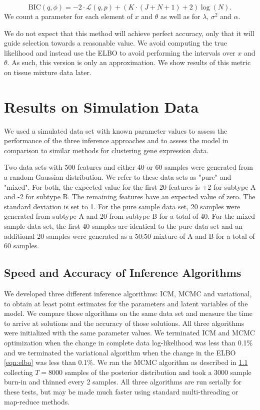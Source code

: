 \documentclass[11pt]{amsart}
\begin{document}
\begin{equation}
\text{BIC}(q,\phi) = -2 \cdot \mathcal{L}(q, p) + \left( K \cdot (J + N + 1) +2 \right) \log(N).
\end{equation} 
We count a parameter for each element of $x$ and $\theta$ as well as for $\lambda$, $\sigma^2$ and $\alpha$.

We do not expect that this method will achieve perfect accuracy, only that it will guide selection towards a reasonable value. We avoid computing the true likelihood and instead use the ELBO to avoid performing the intervals over $x$ and $\theta$. As such, this version is only an approximation. We show results of this metric on tissue mixture data later.

\section{Results on Simulation Data}

We used a simulated data set with known parameter values to assess the performance of the three inference approaches and to assess the model in comparison to similar methods for clustering gene expression data.

Two data sets with 500 features and either 40 or 60 samples were generated from a random Gaussian distribution. We refer to these data sets as "pure" and "mixed". For both, the expected value for the first 20 features is +2 for subtype A and -2 for subtype B. The remaining features have an expected value of zero. The standard deviation is set to 1. For the pure sample data set, 20 samples were generated from subtype A and 20 from subtype B for a total of 40. For the mixed sample data set, the first 40 samples are identical to the pure data set and an additional 20 samples were generated as a 50:50 mixture of A and B for a total of 60 samples. 

\subsection{Speed and Accuracy of Inference Algorithms}
We developed three different inference algorithms: ICM, MCMC and variational, to obtain at least point estimates for the parameters and latent variables of the model. We compare those algorithms on the same data set and measure the time to arrive at solutions and the accuracy of those solutions. All three algorithms were initialized with the same parameter values. We terminated ICM and MCMC optimization when the change in complete data log-likelihood was less than 0.1\% and we terminated the variational algorithm when the change in the ELBO \eqref{eqn:elbo} was less than 0.1\%. We ran the MCMC algorithm as described in \ref{} collecting $T=8000$ samples of the posterior distribution and took a 3000 sample burn-in and thinned every 2 samples. All three algorithms are run serially for these tests, but may be made much faster using standard multi-threading or map-reduce methods.
\end{document}
